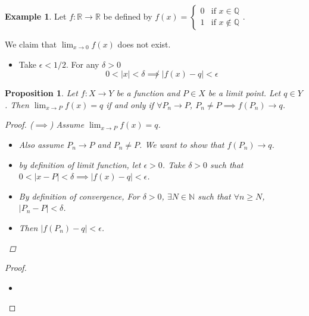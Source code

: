 \documentclass[10pt]{article}
\newcommand{\N}{\mathbb{N}}
\newcommand{\R}{\mathbb{R}}
\newcommand{\Q}{\mathbb{Q}}
\newtheorem{proposition}[theorem]{Proposition}
\theoremstyle{definition}
\newtheorem{example}[theorem]{Example}
\theoremstyle{remark}
\begin{document}
\begin{example}
    Let $f : \R \to \R$ be defined by $f(x) = \begin{cases} 0 & \text{if } x \in \Q \\ 1 & \text{if } x \not\in \Q \end{cases}$. 

    We claim that $\lim_{x \to 0} f(x)$ does not exist.
    \begin{itemize}
        \item Take $\epsilon < 1/2$. For any $\delta > 0$
        $$0 < |x| < \delta \not\implies |f(x) - q| < \epsilon$$
    \end{itemize}

\end{example}

\begin{proposition}
    Let $f : X \to Y$ be a function and $P \in X$ be a limit point. Let $q \in Y$.
    Then $\lim_{x \to P} f(x) = q$ if and only if
    $\forall P_n \to P$, $P_n \neq P \implies f(P_n) \to q$. 
    \begin{proof}
        ($\implies$) Assume $\lim_{x \to P} f(x) = q$.
        \begin{itemize}
            \item Also assume $P_n \to P$ and $P_n \neq P$. We want to show that $f(P_n) \to q$.
            \item by definition of limit function, let $\epsilon > 0$. Take $\delta > 0$ such that $0 < |x - P| < \delta \implies |f(x) - q| < \epsilon$.
            \item By definition of convergence, For $\delta > 0$, $\exists N \in \N$ such that $\forall n \geq N$, $|P_n - P| < \delta$.
            \item Then $|f(P_n) - q| < \epsilon$.
        \end{itemize}
    \end{proof}
\end{proposition}
    \begin{proof}
        \hfill
        \begin{itemize}
            \item
        \end{itemize}
    \end{proof}
\end{document}
